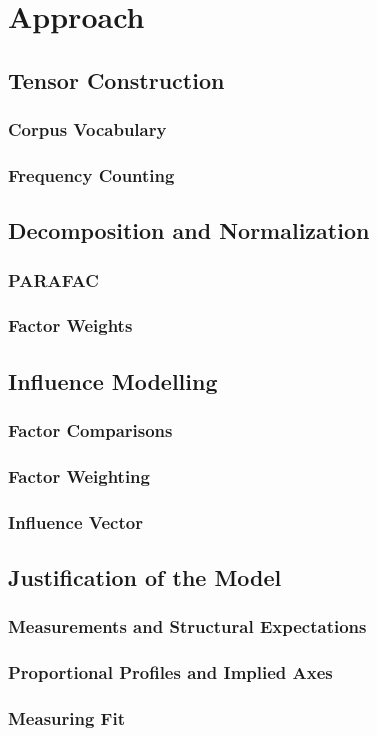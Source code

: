 \documentclass[../dissertation.tex]{subfiles}
\begin{document}
\chapter{Approach}

\section{Tensor Construction}
\subsection{Corpus Vocabulary}
\subsection{Frequency Counting}

\section{Decomposition and Normalization}
\subsection{PARAFAC}
\subsection{Factor Weights}

\section{Influence Modelling}
\subsection{Factor Comparisons}
\subsection{Factor Weighting}
\subsection{Influence Vector}

\section{Justification of the Model}
\subsection{Measurements and Structural Expectations}
\subsection{Proportional Profiles and Implied Axes}
\subsection{Measuring Fit}
\end{document}
